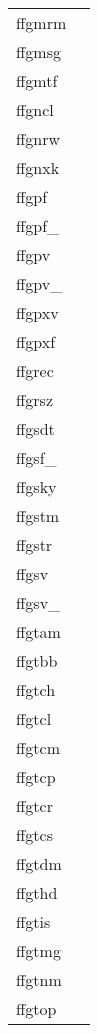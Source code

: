 \documentclass[11pt]{book}
\begin{document}
\begin{tabular}{lr}
ffgmrm   & \pageref{ffgmrm} \\
ffgmsg    & \pageref{ffgmsg} \\
ffgmtf  & \pageref{ffgmtf} \\
ffgncl     & \pageref{ffgnrw} \\
ffgnrw     & \pageref{ffgnrw} \\
ffgnxk      & \pageref{ffgnxk} \\
ffgpf & \pageref{ffgpf} \\
ffgpf\_ & \pageref{ffgpfx} \\
ffgpv         & \pageref{ffgpv} \\
ffgpv\_     & \pageref{ffgpvx} \\
ffgpxv   & \pageref{ffgpxv} \\
ffgpxf  & \pageref{ffgpxf} \\
ffgrec       & \pageref{ffgrec} \\
ffgrsz    & \pageref{ffgrsz} \\
ffgsdt        & \pageref{ffdt2s} \\
ffgsf\_ &  \pageref{ffgsfx} \pageref{ffgsfx2} \\
ffgsky  &  \pageref{ffgsky} \\
ffgstm        & \pageref{ffdt2s} \\
ffgstr         & \pageref{ffgcrd} \\
ffgsv  & \pageref{ffgsv} \\
ffgsv\_  & \pageref{ffgsvx} \pageref{ffgsvx2}\\
ffgtam & \pageref{ffgtam} \\
ffgtbb    & \pageref{ffgtbb} \\
ffgtch  & \pageref{ffgtch} \\
ffgtcl    & \pageref{ffgtcl} \\
ffgtcm & \pageref{ffgtcm} \\
ffgtcp  & \pageref{ffgtcp} \\
ffgtcr  & \pageref{ffgtcr} \\
ffgtcs & \pageref{ffgtcs} \\
ffgtdm         & \pageref{ffgtdm} \\
ffgthd & \pageref{ffgthd} \\
ffgtis  & \pageref{ffgtis} \\
ffgtmg  & \pageref{ffgtmg} \\
ffgtnm  & \pageref{ffgtnm} \\
ffgtop    & \pageref{ffgtop} \\

\end{tabular}
\end{document}
